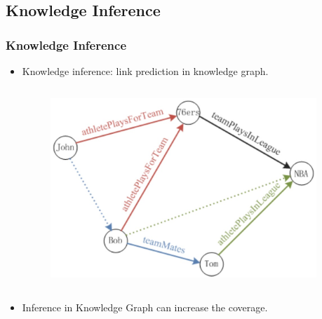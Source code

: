 \documentclass[pdf,10pt]{beamer}
\begin{document}
\subsection{Knowledge Inference}
\begin{frame}
\frametitle{Knowledge Inference}
\begin{itemize}
	\item Knowledge inference: link prediction in knowledge graph.

	\begin{columns}[onlytextwidth]
		\begin{column}{0.45\textwidth}
			\begin{figure}
				\includegraphics[width=.85\textwidth]{4.eps}
			\end{figure}
		\end{column}
		\begin{column}{0.45\textwidth}
			\begin{itemize}
			\end{itemize}
		\end{column}
	\end{columns}
	\item Inference in Knowledge Graph can increase the coverage.
\end{itemize}
\end{frame}
\end{document}
